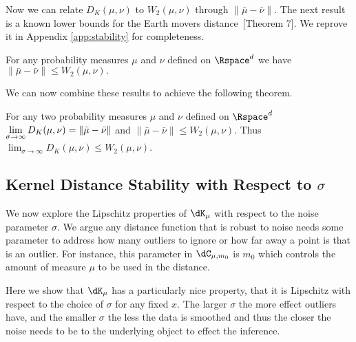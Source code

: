 \documentclass[11pt]{myclass}
\begin{document}
Now we can relate $D_K(\mu,\nu)$ to $W_2(\mu,\nu)$ through $\|\bar \mu - \bar \nu\|$.  
The next result is a known lower bounds for the Earth movers distance~\cite{Coh99}[Theorem 7].  We reprove it in Appendix \ref{app:stability} for completeness.

\begin{lemma} 
For any probability measures $\mu$ and $\nu$ defined on $\Rspace^d$ we have
$\|\bar \mu - \bar \nu\| \leq W_2(\mu,\nu).$
\label{lem:EMD}
\end{lemma}


We can now combine these results to achieve the following theorem.  

\begin{theorem}
\label{thm:DK-W2}
For any two probability measures $\mu$ and $\nu$ defined on $\Rspace^d$ 
$\begin{displaystyle}
\lim_{\sigma \to \infty} D_K(\mu,\nu) = \|\bar \mu - \bar \nu\|
\end{displaystyle}$  and $\|\bar \mu - \bar \nu\| \leq W_2(\mu,\nu).$  Thus
$\lim_{\sigma \to \infty} D_K(\mu,\nu) \leq W_2(\mu,\nu)$.  
\end{theorem}







\subsection{Kernel Distance Stability with Respect to $\sigma$}
\label{subsection:sigma}
We now explore the Lipschitz properties of $\dK_\mu$ with respect to the noise parameter $\sigma$.  
We argue any distance function that is robust to noise needs some parameter to address how many outliers to ignore or how far away a point is that is an  outlier.  For instance, this parameter in $\dC_{\mu, m_0}$ is $m_0$ which controls the amount of measure $\mu$ to be used in the distance.  

Here we show that $\dK_\mu$ has a particularly nice property, that it is Lipschitz with respect to the choice of $\sigma$ for any fixed $x$.  The larger $\sigma$ the more effect outliers have, and the smaller $\sigma$ the less the data is smoothed and thus the closer the noise needs to be to the underlying object to effect the inference.  
\end{document}
